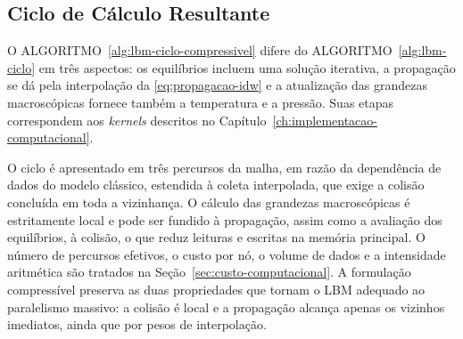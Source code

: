 
\subsection{Ciclo de Cálculo Resultante}\label{subsec:lbm-ciclo-compressivel}

O ALGORITMO~\ref{alg:lbm-ciclo-compressivel} difere do ALGORITMO~\ref{alg:lbm-ciclo} em três aspectos: os equilíbrios incluem uma solução iterativa, a propagação se dá pela interpolação da \eqref{eq:propagacao-idw} e a atualização das grandezas macroscópicas fornece também a temperatura e a pressão.
Suas etapas correspondem aos \textit{kernels} descritos no Capítulo~\ref{ch:implementacao-computacional}.

\begin{algorithm}[H]
\caption{Ciclo de execução de um passo de tempo na formulação compressível}\label{alg:lbm-ciclo-compressivel}
\end{algorithm}

O ciclo é apresentado em três percursos da malha, em razão da dependência de dados do modelo clássico, estendida à coleta interpolada, que exige a colisão concluída em toda a vizinhança.
O cálculo das grandezas macroscópicas é estritamente local e pode ser fundido à propagação, assim como a avaliação dos equilíbrios, à colisão, o que reduz leituras e escritas na memória principal.
O número de percursos efetivos, o custo por nó, o volume de dados e a intensidade aritmética são tratados na Seção~\ref{sec:custo-computacional}.
A formulação compressível preserva as duas propriedades que tornam o LBM adequado ao paralelismo massivo: a colisão é local e a propagação alcança apenas os vizinhos imediatos, ainda que por pesos de interpolação.

